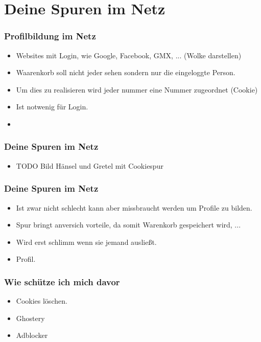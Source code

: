 \section{Deine Spuren im Netz}

\begin{frame}
\frametitle{Profilbildung im Netz}

\begin{itemize}
  \item Websites mit Login, wie Google, Facebook, GMX, ... (Wolke darstellen)
  \item Waarenkorb soll nicht jeder sehen sondern nur die eingeloggte Person.
  \item Um dies zu realisieren wird jeder nummer eine Nummer zugeordnet (Cookie)
  \item Ist notwenig für Login.
  \item
\end{itemize}

\end{frame}

\begin{frame}
\frametitle{Deine Spuren im Netz}

\begin{itemize}
  \item TODO Bild Hänsel und Gretel mit Cookiespur
\end{itemize}

\end{frame}


\begin{frame}
  \frametitle{Deine Spuren im Netz}
  \begin{itemize}
    \item Ist zwar nicht schlecht kann aber missbraucht werden um Profile zu bilden.
    \item Spur bringt anversich vorteile, da somit Warenkorb gespeichert wird, ...
    \item Wird erst schlimm wenn sie jemand ausließt.
    \item Profil.
  \end{itemize}
\end{frame}

\begin{frame}
  \frametitle{Wie schütze ich mich davor}
  \begin{itemize}
    \item Cookies löschen.
    \item Ghostery
    \item Adblocker
  \end{itemize}
\end{frame}


